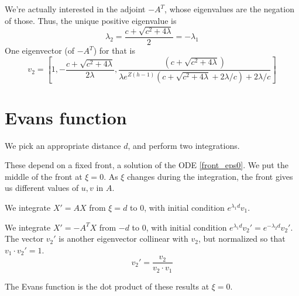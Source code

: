 \documentclass[10pt]{article}
\begin{document}
We're actually interested in the adjoint $-A^T$, whose eigenvalues are the negation of those.
Thus, the unique positive eigenvalue is
\[\lambda_2 = \frac{c + \sqrt{c^2 + 4 \lambda}}{2} = -\lambda_1 \]
One eigenvector (of $-A^T$) for that is
\[
v_2 = \left[1, -\frac{c + \sqrt{c^2 + 4 \lambda}}{2\lambda}, \frac{(c + \sqrt{c^2+4\lambda})}{\lambda e^{Z(h-1)}(c + \sqrt{c^2+4\lambda} + 2 \lambda/c)+ 2 \lambda / c}\right]
\]


\section{Evans function}
We pick an appropriate distance $d$, and perform two integrations.

These depend on a fixed front, a solution of the ODE \eqref{front_eps0}.
We put the middle of the front at $\xi = 0$.  As $\xi$ changes during the integration, the front gives us different values of $u,v$ in $A$.

We integrate $X' = AX$ from $\xi = d$ to $0$, with initial condition $e^{\lambda_1 d}v_1$.

We integrate $X' = -A^T X$ from $-d$ to $0$, with initial condition $e^{\lambda_1 d}v_2' = e^{-\lambda_2 d}v_2'$. The vector $v_2'$ is another eigenvector collinear with $v_2$, but normalized so that $v_1 \cdot v_2' = 1$.
\[v_2' = \frac{v_2}{v_2 \cdot v_1}\]

The Evans function is the dot product of these results at $\xi = 0$.
\end{document}
